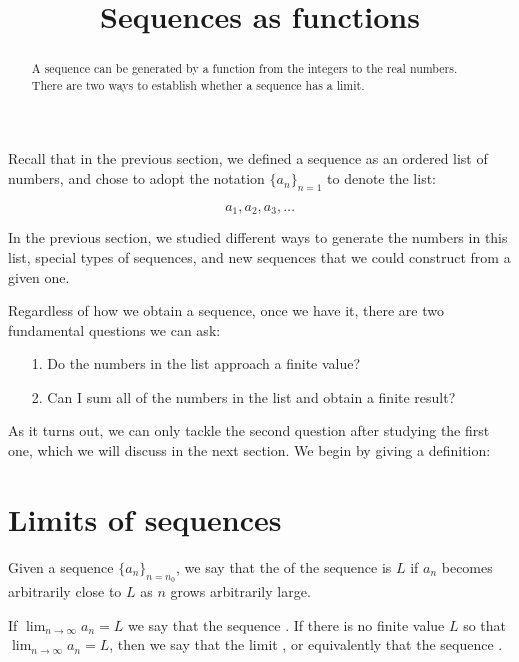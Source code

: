 \documentclass{ximera}
\title[Dig-In:]{Sequences as functions}
\begin{document}
\begin{abstract}
A sequence can be generated by a function from the integers to the real numbers.  There are two ways to establish whether a sequence has a limit.
\end{abstract}
\maketitle

Recall that in the previous section, we defined a sequence as an ordered list of numbers, and chose to adopt the notation $\{a_n\}_{n=1}$ to denote the list:

\[
a_1, a_2, a_3 , \ldots
\]

In the previous section, we studied different ways to generate the numbers in this list, special types of sequences, and new sequences that we could construct from a given one.  

Regardless of how we obtain a sequence, once we have it, there are two fundamental questions we can ask:

\begin{itemize}
\item[1.] Do the numbers in the list approach a finite value?
\item[2.] Can I sum all of the numbers in the list and obtain a finite result?
\end{itemize}

As it turns out, we can only tackle the second question after studying the first one, which we will discuss in the next section.  We begin by giving a definition:


\section{Limits of sequences}



\begin{definition}
  Given a sequence $\{a_n\}_{n =n_0}$, we say that the  of the sequence is $L$ if $a_n$ becomes arbitrarily close to $L$ as $n$ grows arbitrarily large.
  
If $\lim_{n\to\infty}a_n=L$ we say that the sequence
.
If there is no finite value $L$ so that $\lim_{n\to\infty}a_n = L$,
then we say that the limit , or equivalently that
the sequence .
\end{definition}
\end{document}
